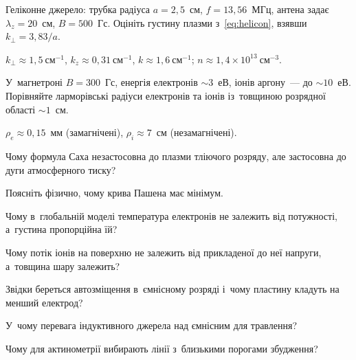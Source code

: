 \begin{problem}\label{prb:Helicon}
	Геліконне джерело: трубка радіуса $a=2{,}5$~см, $f=13{,}56$~МГц, антена задає $\lambda_z=20$~см, $B=500$~Гс.
	Оцініть густину плазми з~\eqref{eq:helicon}, взявши $k_\perp=3{,}83/a$.
	\begin{solution}
		$k_\perp\approx1{,}5~\mathrm{см}^{-1}$, $k_z\approx0{,}31~\mathrm{см}^{-1}$, $k\approx1{,}6~\mathrm{см}^{-1}$;
	$n\approx1{,}4\times10^{13}~\mathrm{см}^{-3}$.
	\end{solution}
\end{problem}

\begin{problem}\label{prb:Magnetron}
	У~магнетроні $B=300$~Гс, енергія електронів $\sim3$~еВ, іонів аргону~--- до $\sim10$~еВ. Порівняйте
	ларморівські радіуси електронів та іонів із~товщиною розрядної області $\sim1$~см.
	\begin{solution}
		$\rho_e\approx0{,}15$~мм (замагнічені), $\rho_i\approx7$~см (незамагнічені).
	\end{solution}
\end{problem}


\begin{Questions}
\begin{quizlist}
	\item Чому формула Саха незастосовна до плазми тліючого розряду, але застосовна до дуги атмосферного тиску?
	\item Поясніть фізично, чому крива Пашена має мінімум.
	\item Чому в~глобальній моделі температура електронів не залежить від потужності, а~густина пропорційна їй?
	\item Чому потік іонів на поверхню не залежить від прикладеної до неї напруги, а~товщина шару залежить?
	\item Звідки береться автозміщення в~ємнісному розряді і~чому пластину кладуть на менший електрод?
	\item У~чому перевага індуктивного джерела над ємнісним для травлення?
	\item Чому для актинометрії вибирають лінії з~близькими порогами збудження?
\end{quizlist}
\end{Questions}

